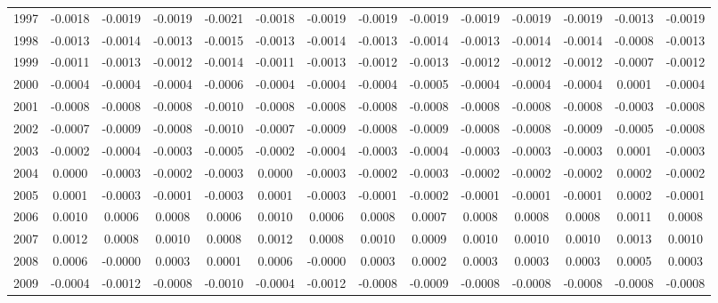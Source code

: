 \begin{tabular}{cccccccccccccc}
  1997 & -0.0018 & -0.0019 & -0.0019 & -0.0021 & -0.0018 & -0.0019 & -0.0019 & -0.0019 & -0.0019 & -0.0019 & -0.0019 & -0.0013 & -0.0019 \\ 
  1998 & -0.0013 & -0.0014 & -0.0013 & -0.0015 & -0.0013 & -0.0014 & -0.0013 & -0.0014 & -0.0013 & -0.0014 & -0.0014 & -0.0008 & -0.0013 \\ 
  1999 & -0.0011 & -0.0013 & -0.0012 & -0.0014 & -0.0011 & -0.0013 & -0.0012 & -0.0013 & -0.0012 & -0.0012 & -0.0012 & -0.0007 & -0.0012 \\ 
  2000 & -0.0004 & -0.0004 & -0.0004 & -0.0006 & -0.0004 & -0.0004 & -0.0004 & -0.0005 & -0.0004 & -0.0004 & -0.0004 & 0.0001 & -0.0004 \\ 
  2001 & -0.0008 & -0.0008 & -0.0008 & -0.0010 & -0.0008 & -0.0008 & -0.0008 & -0.0008 & -0.0008 & -0.0008 & -0.0008 & -0.0003 & -0.0008 \\ 
  2002 & -0.0007 & -0.0009 & -0.0008 & -0.0010 & -0.0007 & -0.0009 & -0.0008 & -0.0009 & -0.0008 & -0.0008 & -0.0009 & -0.0005 & -0.0008 \\ 
  2003 & -0.0002 & -0.0004 & -0.0003 & -0.0005 & -0.0002 & -0.0004 & -0.0003 & -0.0004 & -0.0003 & -0.0003 & -0.0003 & 0.0001 & -0.0003 \\ 
  2004 & 0.0000 & -0.0003 & -0.0002 & -0.0003 & 0.0000 & -0.0003 & -0.0002 & -0.0003 & -0.0002 & -0.0002 & -0.0002 & 0.0002 & -0.0002 \\ 
  2005 & 0.0001 & -0.0003 & -0.0001 & -0.0003 & 0.0001 & -0.0003 & -0.0001 & -0.0002 & -0.0001 & -0.0001 & -0.0001 & 0.0002 & -0.0001 \\ 
  2006 & 0.0010 & 0.0006 & 0.0008 & 0.0006 & 0.0010 & 0.0006 & 0.0008 & 0.0007 & 0.0008 & 0.0008 & 0.0008 & 0.0011 & 0.0008 \\ 
  2007 & 0.0012 & 0.0008 & 0.0010 & 0.0008 & 0.0012 & 0.0008 & 0.0010 & 0.0009 & 0.0010 & 0.0010 & 0.0010 & 0.0013 & 0.0010 \\ 
  2008 & 0.0006 & -0.0000 & 0.0003 & 0.0001 & 0.0006 & -0.0000 & 0.0003 & 0.0002 & 0.0003 & 0.0003 & 0.0003 & 0.0005 & 0.0003 \\ 
  2009 & -0.0004 & -0.0012 & -0.0008 & -0.0010 & -0.0004 & -0.0012 & -0.0008 & -0.0009 & -0.0008 & -0.0008 & -0.0008 & -0.0008 & -0.0008 \\ 
   \hline
\end{tabular}
